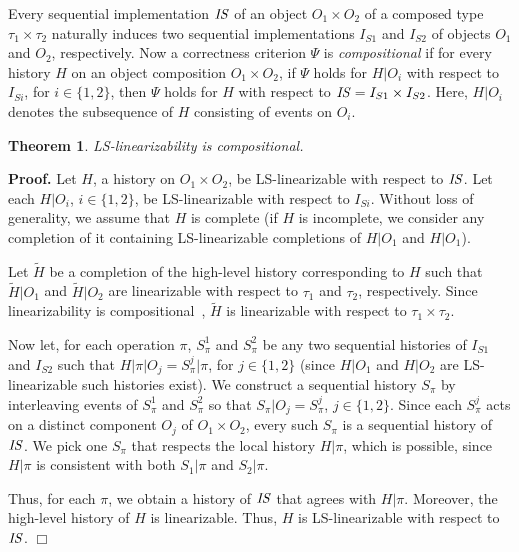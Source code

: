 \documentclass[11pt,pdftex,letterpaper]{article}
\newtheorem{theorem}{Theorem}
\newenvironment{proof}[1][Proof]{\noindent\textbf{#1.} }{\hfill $\Box$\\[2mm]}
\newcommand{\LS}{LS}
\newcommand{\id}[1]{\mbox{\textit{#1}}}\newcommand{\res}[1]{\mbox{\textbf{#1}}}
\begin{document}
Every sequential implementation $\id{IS}$ of an object  $O_1\times O_2$ of a
composed type $\tau_1\times\tau_2$ naturally induces two sequential
implementations $I_{S1}$ and $I_{S2}$ of objects $O_1$ and $O_2$,
respectively. 
Now a correctness criterion 
$\Psi$
is \emph{compositional} if for every
history $H$ on an object composition $O_1\times O_2$, 
if 
$\Psi$
holds for $H|O_i$ with
respect to $I_{Si}$, for $i \in \{1,2\}$, then
$\Psi$
holds for $H$ with
respect to $\id{IS}=I_{S1}\times I_{S2}$.
Here, $H|O_i$ denotes the subsequence of $H$ consisting of events on $O_i$.
\begin{theorem}
\label{th:comp}
\LS-linearizability is compositional. 
\end{theorem}
\begin{proof}
Let $H$, a history on $O_1\times O_2$,  be \LS-linearizable
with respect to $\id{IS}$. 
Let each $H|O_i$, 
$i\in\{1,2\}$, 
be \LS-linearizable with respect to $I_{Si}$. 
Without loss of generality,  we assume that $H$ is complete (if $H$
is incomplete, we consider any completion of it containing
\LS-linearizable completions of  $H|O_1$ and $H|O_1$).

Let $\tilde H$ be a completion of the high-level history corresponding to $H$ such that
$\tilde H|O_1$ and $\tilde H|O_2$ are linearizable with respect to $\tau_1$
and $\tau_2$, respectively. Since linearizability is
compositional~\cite{HW90,HS08-book}, $\tilde H$ is linearizable with respect to $\tau_1\times\tau_2$.

Now let, for each operation $\pi$, $S_{\pi}^1$ and $S_{\pi}^2$ be any two sequential histories of
$I_{S1}$ and $I_{S2}$  such that $H|\pi|O_j=S_{\pi}^j|\pi$, for $j \in \{1,2\}$
(since 
$H|O_1$
and $H|O_2$ are \LS-linearizable such histories exist).
We construct a sequential history $S_{\pi}$ by interleaving events of
$S_{\pi}^1$ and $S_{\pi}^2$ so that $S_{\pi}|O_j=S_{\pi}^j$, 
$j\in\{1,2\}$.
Since each $S_{\pi}^j$ acts on a distinct component $O_j$ of $O_1\times
O_2$, every such $S_{\pi}$ is a sequential history of $\id{IS}$.
We pick one $S_{\pi}$ that respects the local history $H|\pi$,
which is possible, since $H|\pi$ is consistent with both    
$S_1|\pi$ and $S_2|\pi$. 

Thus, for each $\pi$, we obtain a history of $\id{IS}$ that agrees with
$H|\pi$. Moreover, the high-level history of $H$ is linearizable. Thus, $H$ is \LS-linearizable with respect to $\id{IS}$. 
\end{proof}
\end{document}
